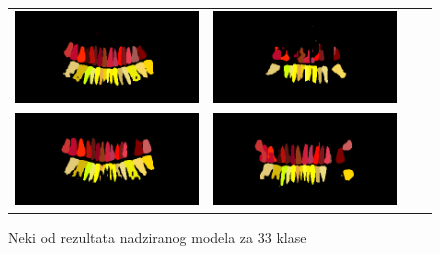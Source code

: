 \begin{figure}
\begin{tabular}{cccc}
\hspace{-1.5cm}
{\includegraphics[width = 8cm]{slike/rezultati/super33klase1.png}} &
{\includegraphics[width = 8cm]{slike/rezultati/super33klase2.png}}\\
\hspace{-1.5cm}
{\includegraphics[width = 8cm]{slike/rezultati/super33klase3.png}} &
{\includegraphics[width = 8cm]{slike/rezultati/super33klase4.png}}\\
\end{tabular}
\caption{Neki od rezultata nadziranog modela za 33 klase}
\end{figure}

